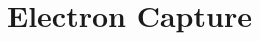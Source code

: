 \hypertarget{group___e_g_x_phys-_q_value-_electron_capture}{}\section{Electron Capture}
\label{group___e_g_x_phys-_q_value-_electron_capture}
